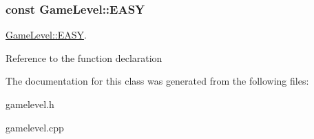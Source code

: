 \subsubsection[{E\+A\+S\+Y}]{ const Game\+Level\+::\+E\+A\+S\+Y\hspace{0.3cm}{\ttfamily [static]}}\label{class_game_level_a4de2cb0a8609b8e9a76f64a1502a71de}


\hyperlink{class_game_level_a4de2cb0a8609b8e9a76f64a1502a71de}{Game\+Level\+::\+E\+A\+S\+Y}. 

Reference to the function declaration 

The documentation for this class was generated from the following files\+:\begin{DoxyCompactItemize}
\item 
gamelevel.\+h\item 
gamelevel.\+cpp\end{DoxyCompactItemize}
